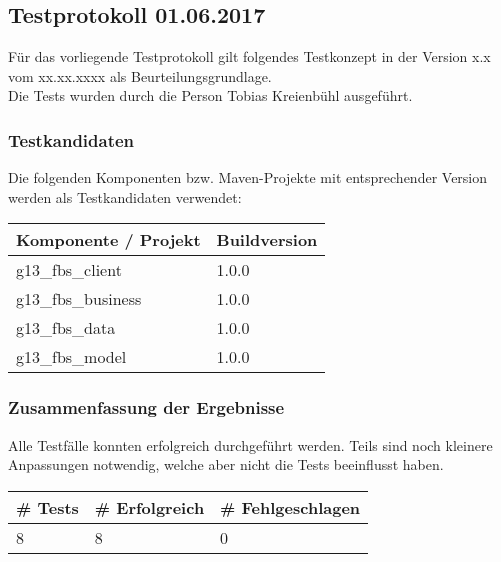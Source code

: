 \subsection{Testprotokoll 01.06.2017}
Für das vorliegende Testprotokoll gilt folgendes Testkonzept in der Version x.x vom xx.xx.xxxx als Beurteilungsgrundlage. \\
Die Tests wurden durch die Person Tobias Kreienbühl ausgeführt.
\subsubsection{Testkandidaten}
Die folgenden Komponenten bzw. Maven-Projekte mit entsprechender Version werden als Testkandidaten verwendet:\\
\begin{tabular}{|l|l|}
	\hline \rowcolor{gray!50}
	\textbf{Komponente / Projekt} & \textbf{Buildversion} \\ 
	\hline 
	g13\_fbs\_client & 1.0.0 \\ 
	\hline 
	g13\_fbs\_business & 1.0.0 \\ 
	\hline 
	g13\_fbs\_data & 1.0.0 \\ 
	\hline 
	g13\_fbs\_model & 1.0.0 \\ 
	\hline 
\end{tabular} 

\subsubsection{Zusammenfassung der Ergebnisse}
Alle Testfälle konnten erfolgreich durchgeführt werden. Teils sind noch kleinere Anpassungen notwendig, welche aber nicht die Tests beeinflusst haben. \\
\begin{tabular}{|l|l|l|}
	\hline \rowcolor{gray!50}
	\textbf{\# Tests} & \textbf{\# Erfolgreich} & \textbf{\# Fehlgeschlagen} \\ 
	\hline 
	8 & 8 & 0 \\ 
	\hline 
\end{tabular} 

